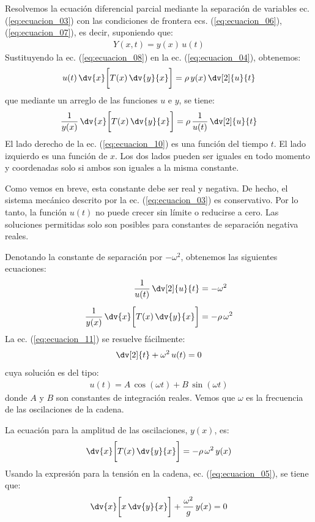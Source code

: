 Resolvemos la ecuación diferencial parcial mediante la separación de variables ec. (\ref{eq:ecuacion_03}) con las condiciones de frontera ecs. (\ref{eq:ecuacion_06}), (\ref{eq:ecuacion_07}), es decir, suponiendo que:
\begin{align}
Y (x, t) = y (x) \, u (t)
\label{eq:ecuacion_08}
\end{align}
Sustituyendo la ec. (\ref{eq:ecuacion_08}) en la ec. (\ref{eq:ecuacion_04}), obtenemos:
\begin{align}
u (t) \, \dv{x} \bigg[ T (x) \, \dv{y}{x} \bigg] = \rho \, y (x) \, \dv[2]{u}{t}
\label{eq:ecuacion_09}
\end{align}
que mediante un arreglo de las funciones $u$ e $y$, se tiene:
\begin{align}
\dfrac{1}{y (x)} \, \dv{x} \bigg[ T (x) \, \dv{y}{x} \bigg] = \rho \, \dfrac{1}{u (t)} \, \dv[2]{u}{t}
\label{eq:ecuacion_10}
\end{align}
El lado derecho de la ec. (\ref{eq:ecuacion_10}) es una función del tiempo $t$. El lado izquierdo es una función de $x$. Los dos lados pueden ser iguales en todo momento y coordenadas solo si ambos son iguales a la misma constante.
\par
Como vemos en breve, esta constante debe ser real y negativa. De hecho, el sistema mecánico descrito por la ec. (\ref{eq:ecuacion_03}) es conservativo. Por lo tanto, la función $u (t)$ no puede crecer sin límite o reducirse a cero. Las soluciones permitidas solo son posibles para constantes de separación negativa reales.
\par
Denotando la constante de separación por $- \omega^{2}$, obtenemos las siguientes ecuaciones:
\begin{align}
\dfrac{1}{u (t)} \, \dv[2]{u}{t} &= - \omega^{2} \label{eq:ecuacion_11} \\[0.5em]
\dfrac{1}{y (x)} \, \dv{x} \bigg[ T (x) \, \dv{y}{x} \bigg] &= - \rho \, \omega^{2} \label{eq:ecuacion_12}
\end{align}
La ec. (\ref{eq:ecuacion_11}) se resuelve fácilmente:
\begin{align}
\dv[2]{t} + \omega^{2} \, u (t) = 0
\label{eq:ecuacion_13}
\end{align}
cuya solución es del tipo:
\begin{align}
u (t) = A \, \cos (\omega t) + B \, \sin (\omega t)
\label{eq:ecuacion_14}
\end{align}
donde $A$ y $B$ son constantes de integración reales. Vemos que $\omega$ es la frecuencia de las oscilaciones de la cadena.
\par
La ecuación para la amplitud de las oscilaciones, $y (x)$, es:
\begin{align}
\dv{x} \bigg[ T (x) \, \dv{y}{x} \bigg] = - \rho \, \omega^{2} \, y (x)
\label{eq:ecuacion_15}
\end{align}
Usando la expresión para la tensión en la cadena, ec. (\ref{eq:ecuacion_05}), se tiene que:
\begin{align}
\dv{x} \bigg[ x \, \dv{y}{x} \bigg] + \dfrac{\omega^{2}}{g} \, y(x) = 0
\label{eq:ecuacion_16}
\end{align}


